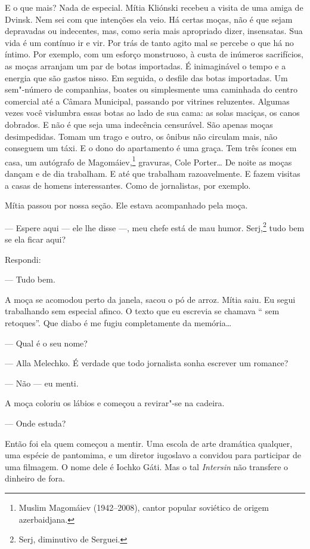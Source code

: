 E o que mais? Nada de especial. Mítia Kliónski recebeu a visita de uma
amiga de Dvinsk. Nem sei com que intenções ela veio. Há certas moças,
não é que sejam depravadas ou indecentes, mas, como seria mais
apropriado dizer, insensatas. Sua vida é um contínuo ir e vir. Por trás
de tanto agito mal se percebe o que há no íntimo. Por exemplo, com um
esforço monstruoso, à custa de inúmeros sacrifícios, as moças arranjam
um par de botas importadas. É inimaginável o tempo e a energia que são
gastos nisso. Em seguida, o desfile das botas importadas. Um sem"-número
de companhias, boates ou simplesmente uma caminhada do centro comercial
até a Câmara Municipal, passando por vitrines reluzentes. Algumas vezes
você vislumbra essas botas ao lado de sua cama: as solas maciças, os
canos dobrados. E não é que seja uma indecência censurável. São apenas
moças desimpedidas. Tomam um trago e outro, os ônibus não circulam mais,
não conseguem um táxi. E o dono do apartamento é uma graça. Tem três
ícones em casa, um autógrafo de Magomáiev,\footnote{Muslim Magomáiev
  (1942--2008), cantor popular soviético de origem azerbaidjana.}
gravuras, Cole Porter\ldots{} De noite as moças dançam e de dia trabalham. E
até que trabalham razoavelmente. E fazem visitas a casas de homens
interessantes. Como de jornalistas, por exemplo.

Mítia passou por nossa seção. Ele estava acompanhado pela moça.

--- Espere aqui --- ele lhe disse ---, meu chefe está de mau humor.
Serj,\footnote{Serj, diminutivo de Serguei.} tudo bem se ela ficar aqui?

Respondi:

--- Tudo bem.

A moça se acomodou perto da janela, sacou o pó de arroz. Mítia saiu. Eu
segui trabalhando sem especial afinco. O texto que eu escrevia se
chamava `` sem retoques''. Que diabo é  me fugiu completamente da
memória\ldots{}

--- Qual é o seu nome?

--- Alla Melechko. É verdade que todo jornalista sonha escrever um
romance?

--- Não --- eu menti.

A moça coloriu os lábios e começou a revirar"-se na cadeira.

--- Onde estuda?

Então foi ela quem começou a mentir. Uma escola de arte dramática
qualquer, uma espécie de pantomima, e um diretor iugoslavo a convidou
para participar de uma filmagem. O nome dele é Iochko Gáti. Mas o tal
\emph{Intersin} não transfere o dinheiro de fora.

